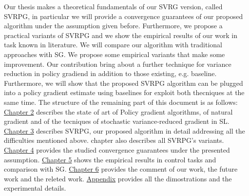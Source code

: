 Our thesis makes a theoretical fundamentals of our \acs{SVRG} version, called \acs{SVRPG}, in particular we will provide a convergence guarantees of our proposed algorithm under the assumption given before. Furthermore, we propose a practical variants of \acs{SVRPG} and we show the empirical results of our work in task known in literature. We will compare our algorithm with traditional approaches with \acs{SG}. We propose some empirical variants that make some improvement.
Our contribution bring about a further technique for variance reduction in policy gradiend in addition to those existing, e.g. baseline.  Furthermore, we will show that the proposed \acs{SVRPG} algorithm can be plugged into a policy gradient estimate using baselines for exploit both thecniques at the same time.\newline
The structure of the remaining part of this document is as follows:
\hyperref[chap:art]{Chapter 2} describes the state of art of Policy gradient algorithms, of natural gradient and of the tecniques of stochastic variance-reduced gradient in \acs{SL}.\newline
\hyperref[chap:art]{Chapter 3} describes SVRPG, our proposed algorithm in detail addressing all the difficulties mentioned above. chapter also describes all SVRPG's variants.\newline
\hyperref[chap:art]{Chapter 4} provides the studied convergence guarantees under the presented assumption.\newline
\hyperref[chap:art]{Chapter 5} shows the empirical results in control tasks and comparison with \acs{SG}.\newline
\hyperref[chap:art]{Chapter 6} provides the comment of our work, the future work and the releted work.\newline
\hyperref[chap:art]{Appendix} provides all the dimostrations and the experimental details.
